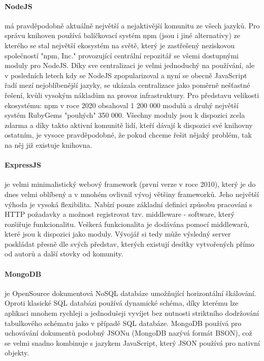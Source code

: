 \documentclass[thesis=B,czech]{FITthesis}[2019/12/23]
\begin{document}
\paragraph{NodeJS} má pravděpodobně aktuálně největší a nejaktivější komunitu ze všech jazyků. Pro správu knihoven používá balíčkovací systém npm (jsou i jiné alternativy) ze kterého se stal největší ekosystém na světě, který je zastřešený neziskovou společností "npm, Inc." provozující centrální repozitář se všemi dostupnými moduly pro NodeJS. Díky sve centralizaci je velmi jednoduchý na používání, ale v posledních letech kdy se NodeJS zpopularizoval a nyní se obecně JavaScript řadí mezí nejoblíbenější jazyky, se ukázala centralizace jako poměrně nešťastné řešení, kvůli vysokým nákladům na provoz infrastruktury. Pro představu velikosti ekosystému: npm v roce 2020 obsahoval 1 200 000 modulů a druhý největší systém RubyGems "pouhých" 350 000. Všechny moduly jsou k dispozici zcela zdarma a díky takto aktivní komunitě lidí, kteří dávají k dispozici své knihovny ostatním, je vysoce pravděpodobné, že pokud chceme řešit nějaký problém, tak na něj již existuje knihovna.

\paragraph{ExpressJS} je velmi minimalistický webový framework (první verze v roce 2010), který je do dnes velmi oblíbený a v mnohém ovlivnil vývoj většiny frameworků. Jeho největší výhoda je vysoká flexibilita. Nabízí pouze základní definici způsobu pracování s HTTP požadavky a možnost registrovat tzv. middleware - software, který rozšiřuje funkcionalitu. Veškerá funkcionalita je dodávána pomocí middlewarů, které jsou k dispozici jako moduly. Vývojář si tedy může výsledný server poskládat přesně dle svých představ, kterých existují desítky vytvořených přímo od autorů a další stovky od komunity.

\paragraph{MongoDB} je OpenSource dokumentová NoSQL databáze umožňující horizontální škálování. Oproti klasické SQL databázi používá dynamické schéma, díky kterému lze aplikaci mnohem rychleji a jednodušeji vyvíjet bez nutnosti striktního dodržování tabulkového schématu jako v případě SQL databáze. MongoDB používá pro uchovávání dokumentů podobný JSONu (MongoDB nazývá formát BSON), což se velmi snadno kombinuje s jazykem JavaScript, který JSON používá pro nativní objekty.
\end{document}
